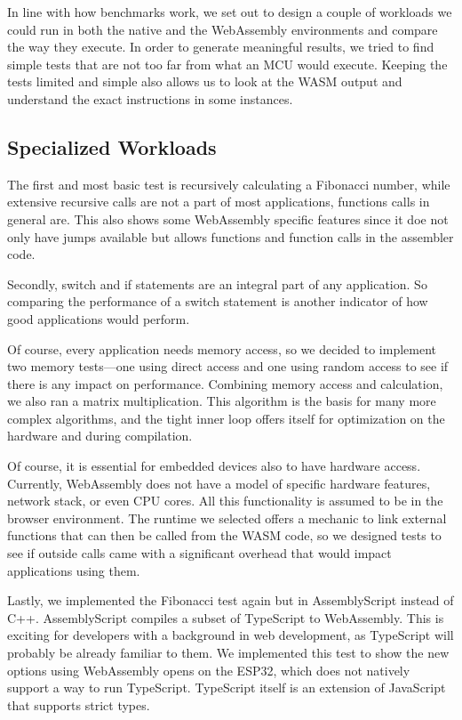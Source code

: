 In line with how benchmarks work, we set out to design a couple of workloads we could run in both the native and the WebAssembly environments and compare the way they execute. In order to generate meaningful results, we tried to find simple tests that are not too far from what an MCU would execute. Keeping the tests limited and simple also allows us to look at the WASM output and understand the exact instructions in some instances.

\subsection{Specialized Workloads}

The first and most basic test is recursively calculating a Fibonacci number, while extensive recursive calls are not a part of most applications, functions calls in general are. This also shows some WebAssembly specific features since it doe not only have jumps available but allows functions and function calls in the assembler code.

Secondly, switch and if statements are an integral part of any application. So comparing the performance of a switch statement is another indicator of how good applications would perform.

Of course, every application needs memory access, so we decided to implement two memory tests—one using direct access and one using random access to see if there is any impact on performance. Combining memory access and calculation, we also ran a matrix multiplication. This algorithm is the basis for many more complex algorithms, and the tight inner loop offers itself for optimization on the hardware and during compilation.

Of course, it is essential for embedded devices also to have hardware access. Currently, WebAssembly does not have a model of specific hardware features, network stack, or even CPU cores. All this functionality is assumed to be in the browser environment. The runtime we selected offers a mechanic to link external functions that can then be called from the WASM code, so we designed tests to see if outside calls came with a significant overhead that would impact applications using them.

Lastly, we implemented the Fibonacci test again but in AssemblyScript instead of C++. AssemblyScript \autocite{noauthor_assemblyscriptassemblyscript_2020} compiles a subset of TypeScript to WebAssembly. This is exciting for developers with a background in web development, as TypeScript will probably be already familiar to them. We implemented this test to show the new options using WebAssembly opens on the ESP32, which does not natively support a way to run TypeScript. TypeScript itself is an extension of JavaScript that supports strict types.

